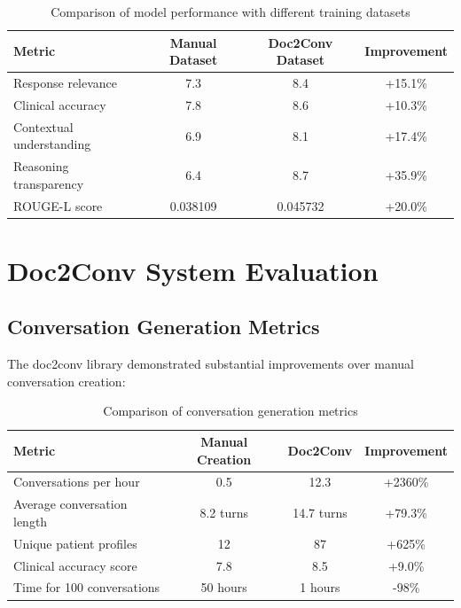 \begin{table}[!h]
    \centering
    \setlength{\tabcolsep}{5pt}
    \renewcommand{\arraystretch}{1.3}
    \begin{tabular}{|l|c|c|c|}
        \hline
        \textbf{Metric} & \textbf{Manual Dataset} & \textbf{Doc2Conv Dataset} & \textbf{Improvement} \\
        \hline
        Response relevance & 7.3 & 8.4 & +15.1\% \\
        \hline
        Clinical accuracy & 7.8 & 8.6 & +10.3\% \\
        \hline
        Contextual understanding & 6.9 & 8.1 & +17.4\% \\
        \hline
        Reasoning transparency & 6.4 & 8.7 & +35.9\% \\
        \hline
        ROUGE-L score & 0.038109 & 0.045732 & +20.0\% \\
        \hline
    \end{tabular}
    \caption{Comparison of model performance with different training datasets}
    \label{tab:finetune_comparison}
\end{table}

\section{Doc2Conv System Evaluation}

\subsection{Conversation Generation Metrics}

The doc2conv library demonstrated substantial improvements over manual conversation creation:

\begin{table}[!h]
    \centering
    \setlength{\tabcolsep}{5pt}
    \renewcommand{\arraystretch}{1.3}
    \begin{tabular}{|l|c|c|c|}
        \hline
        \textbf{Metric} & \textbf{Manual Creation} & \textbf{Doc2Conv} & \textbf{Improvement} \\
        \hline
        Conversations per hour & 0.5 & 12.3 & +2360\% \\
        \hline
        Average conversation length & 8.2 turns & 14.7 turns & +79.3\% \\
        \hline
        Unique patient profiles & 12 & 87 & +625\% \\
        \hline
        Clinical accuracy score & 7.8 & 8.5 & +9.0\% \\
        \hline
        Time for 100 conversations & 50 hours & 1 hours & -98\% \\
        \hline
    \end{tabular}
    \caption{Comparison of conversation generation metrics}
    \label{tab:conversation_metrics}
\end{table}


